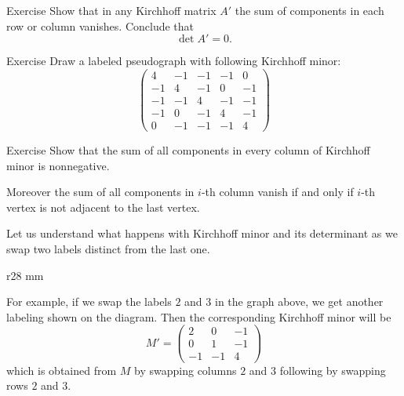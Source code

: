 \begin{thm}{Exercise}
Show that in any Kirchhoff matrix $A'$ the sum of components in each row or column vanishes.
Conclude that 
\[\det A'=0.\]

\end{thm}

\begin{thm}{Exercise}
Draw a labeled pseudograph with following Kirchhoff minor:
\[\left(
\begin{matrix}
4&-1&-1&-1&0
\\
-1&4&-1&0&-1
\\
-1&-1&4&-1&-1
\\
-1&0&-1&4&-1
\\
0&-1&-1&-1&4
\end{matrix}
\right)\]
\end{thm}

\begin{thm}{Exercise}\label{ex:sum-kirchhoff}
Show that the sum of all components in every column of Kirchhoff minor is nonnegative.

Moreover the sum of all components in $i$-th column vanish if and only if $i$-th vertex is not adjacent to the last vertex.
\end{thm}



Let us understand what happens with Kirchhoff minor and its determinant as we swap two labels distinct from the last one.

\begin{wrapfigure}[6]{r}{28 mm}
\end{wrapfigure}

For example, if we swap the labels $2$ and $3$ in the graph above,
we get another labeling shown on the diagram.
Then the corresponding Kirchhoff minor will be 
\[
M'=\left(
\begin{matrix}
2&0&-1
\\
0&1&-1
\\
-1&-1&4
\end{matrix}
\right)
\]
which is obtained from $M$ by swapping columns $2$ and $3$ following by swapping rows $2$ and $3$.


